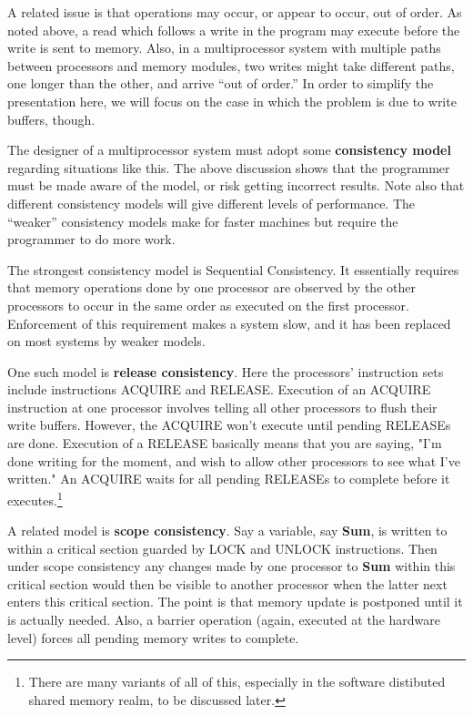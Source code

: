A related issue is that operations may occur, or appear to occur, out of
order.  As noted above, a read which follows a write in the program may
execute before the write is sent to memory.  Also, in a multiprocessor
system with multiple paths between processors and memory modules, two
writes might take different paths, one longer than the other, and arrive
``out of order.''  In order to simplify the presentation here, we will
focus on the case in which the problem is due to write buffers, though.

The designer of a multiprocessor system must adopt some {\bf consistency
model} regarding situations like this.  The above discussion shows that
the programmer must be made aware of the model, or risk getting
incorrect results.  Note also that different consistency models will
give different levels of performance.  The ``weaker'' consistency models
make for faster machines but require the programmer to do more work.

The strongest consistency model is Sequential Consistency.  It
essentially requires that memory operations done by one processor
are observed by the other processors to occur in the same order as
executed on the first processor.  Enforcement of this requirement makes
a system slow, and it has been replaced on most systems by weaker
models.

One such model is {\bf release consistency}.  Here the processors' instruction
sets include instructions ACQUIRE and RELEASE.  Execution of an ACQUIRE
instruction at one processor involves telling all other processors to
flush their write buffers.  However, the ACQUIRE won't execute until
pending RELEASEs are done.  Execution of a RELEASE basically means that
you are saying, "I'm done writing for the moment, and wish to allow
other processors to see what I've written."  An ACQUIRE waits for all
pending RELEASEs to complete before it executes.\footnote{There are many
variants of all of this, especially in the software distibuted shared
memory realm, to be discussed later.}

A related model is {\bf scope consistency}.  Say a variable, say {\bf
Sum}, is written to within a critical section guarded by LOCK and UNLOCK
instructions.  Then under scope consistency any changes made by one
processor to {\bf Sum} within this critical section would then be
visible to another processor when the latter next enters this critical
section.  The point is that memory update is postponed until it is
actually needed.  Also, a barrier operation (again, executed at the
hardware level) forces all pending memory writes to complete.

